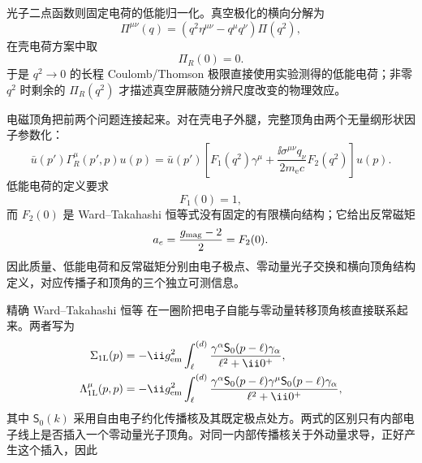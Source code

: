 光子二点函数则固定电荷的低能归一化。真空极化的横向分解为
\begin{equation*}
\Pi^{\mu\nu}(q)
=(q^2\eta^{\mu\nu}-q^\mu q^\nu)\Pi(q^2),
\end{equation*}
在壳电荷方案中取
\begin{equation}
{\Pi_R(0)=0.}
\label{eq:qed-onshell-vacpol-condition-dp53}
\end{equation}
于是 \(q^2\to0\) 的长程 Coulomb/Thomson 极限直接使用实验测得的低能电荷；非零 \(q^2\) 时剩余的 \(\Pi_R(q^2)\) 才描述真空屏蔽随分辨尺度改变的物理效应。

电磁顶角把前两个问题连接起来。对在壳电子外腿，完整顶角由两个无量纲形状因子参数化：
\begin{equation*}
\bar u(p')\Gamma_R^\mu(p',p)u(p)
=\bar u(p')\left[
F_1(q^2)\gamma^\mu
+\frac{\ii\sigma^{\mu\nu}q_\nu}{2m_{\mathrm e} c}F_2(q^2)
\right]u(p).
\end{equation*}
低能电荷的定义要求
\begin{equation}
{F_1(0)=1,}
\label{eq:qed-F1-charge-normalization-dp53}
\end{equation}
而 \(F_2(0)\) 是 Ward--Takahashi 恒等式没有固定的有限横向结构；它给出反常磁矩
\begin{equation*}
a_e=\frac{g_{\rm mag}-2}{2}=F_2(0).
\end{equation*}
因此质量、低能电荷和反常磁矩分别由电子极点、零动量光子交换和横向顶角结构定义，对应传播子和顶角的三个独立可测信息。

精确 Ward--Takahashi 恒等 在一圈阶把电子自能与零动量转移顶角核直接联系起来。两者写为
\begin{equation}
{
\begin{aligned}
\Sigma_{\rm 1L}(p)
&=-\ii g_{\rm em}^2
\int_{\ell}^{(d)}
\frac{\gamma^\alpha\mathsf S_0(p-\ell)\gamma_\alpha}
{\ell^2+\ii0^+},\\
\Lambda_{\rm 1L}^{\mu}(p,p)
&=-\ii g_{\rm em}^2
\int_{\ell}^{(d)}
\frac{\gamma^\alpha\mathsf S_0(p-\ell)\gamma^\mu
\mathsf S_0(p-\ell)\gamma_\alpha}
{\ell^2+\ii0^+},
\end{aligned}}
\label{eq:qed-one-loop-selfenergy-vertex-kernels-dp68}
\end{equation}
其中 \(\mathsf S_0(k)\) 采用自由电子约化传播核及其既定极点处方。两式的区别只有内部电子线上是否插入一个零动量光子顶角。对同一内部传播核关于外动量求导，正好产生这个插入，因此


